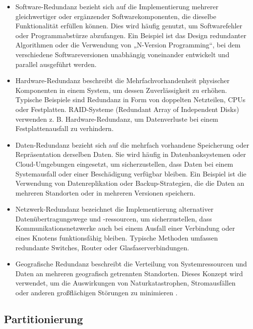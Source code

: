 \begin{itemize}
    \item Software-Redundanz bezieht sich auf die Implementierung mehrerer gleichwertiger oder ergänzender Softwarekomponenten, die dieselbe Funktionalität erfüllen können. Dies wird häufig genutzt, um Softwarefehler oder Programmabstürze abzufangen. Ein Beispiel ist das Design redundanter Algorithmen oder die Verwendung von „N-Version Programming“, bei dem verschiedene Softwareversionen unabhängig voneinander entwickelt und parallel ausgeführt werden.
    \item Hardware-Redundanz beschreibt die Mehrfachvorhandenheit physischer Komponenten in einem System, um dessen Zuverlässigkeit zu erhöhen. Typische Beispiele sind Redundanz in Form von doppelten Netzteilen, CPUs oder Festplatten. RAID-Systeme (Redundant Array of Independent Disks) verwenden z. B. Hardware-Redundanz, um Datenverluste bei einem Festplattenausfall zu verhindern.
    \item Daten-Redundanz bezieht sich auf die mehrfach vorhandene Speicherung oder Repräsentation derselben Daten. Sie wird häufig in Datenbanksystemen oder Cloud-Umgebungen eingesetzt, um sicherzustellen, dass Daten bei einem Systemausfall oder einer Beschädigung verfügbar bleiben. Ein Beispiel ist die Verwendung von Datenreplikation oder Backup-Strategien, die die Daten an mehreren Standorten oder in mehreren Versionen speichern.
    \item Netzwerk-Redundanz bezeichnet die Implementierung alternativer Datenübertragungswege und -ressourcen, um sicherzustellen, dass Kommunikationsnetzwerke auch bei einem Ausfall einer Verbindung oder eines Knotens funktionsfähig bleiben. Typische Methoden umfassen redundante Switches, Router oder Glasfaserverbindungen. 
    \item Geografische Redundanz beschreibt die Verteilung von Systemressourcen und Daten an mehreren geografisch getrennten Standorten. Dieses Konzept wird verwendet, um die Auswirkungen von Naturkatastrophen, Stromausfällen oder anderen großflächigen Störungen zu minimieren \cite{g4g-redundancy}.
   
\end{itemize}


\subsection{Partitionierung}

